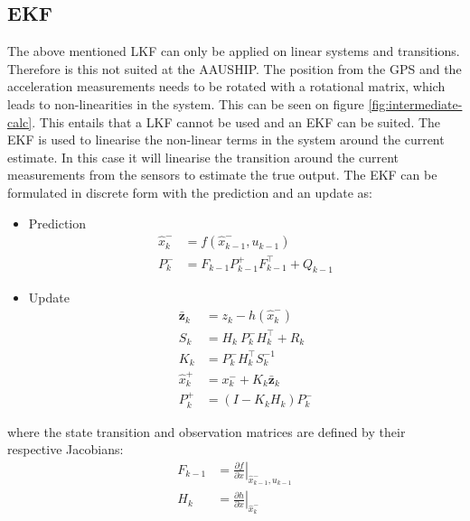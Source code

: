 \subsection{\acl{EKF}}
The above mentioned \ac{LKF} can only be applied on linear systems and transitions. Therefore is this not suited at the AAUSHIP. The position from the \ac{GPS} and the acceleration measurements needs to be rotated with a rotational matrix, which leads to non-linearities in the system. This can be seen on figure \vref{fig:intermediate-calc}. This entails that a \ac{LKF} cannot be used and an \ac{EKF} can be suited. The \ac{EKF} is used to linearise the non-linear terms in the system around the current estimate. In this case it will linearise the transition around the current measurements from the sensors to estimate the true output. The \ac{EKF} can be formulated in discrete form with the prediction and an update as:
\begin{itemize}\tightlist
\item Prediction
\begin{align}
\hat x_k^- &= f(\hat x_{k-1}^-,u_{k-1})\\
P_k^- &= F_{k-1}P_{k-1}^+F_{k-1}^\top+Q_{k-1}
\end{align}
\item Update
\begin{align}
\bar{\mathbf{z}}_k &= z_k - h(\hat x_k^-)\\
S_k &= H_k\ P_k^-H_k^\top + R_k\\
K_k &= P_k^-H_k^\top S_k^{-1}\\
\hat x_k^+ &= x_k^- + K_k \bar{\mathbf{z}}_k\\
P_k^+ &= (I - K_k H_k) P_k^-
\end{align}
\end{itemize}
where the state transition and observation matrices are defined by their respective Jacobians:
\begin{align}
F_{k-1} &= \left.\frac{\partial f}{\partial x}\right|_{\hat x_{k-1}^-,u_{k-1}} \label{eq:EKFF}\\
H_k &= \left.\frac{\partial h}{\partial x}\right|_{\hat x_{k}^-}
\end{align}

